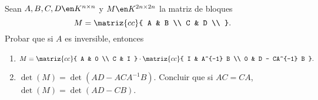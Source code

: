 \begin{enunciado}{\ejercicio}
  Sean $A, B, C, D \en K^{n \times n}$ y $M \en K^{2n \times 2n}$ la matriz de bloques
  $$
    M =
    \matriz{cc}{
      A & B \\
      C & D \\
    }.
  $$
  Probar que si $A$ es inversible, entonces
  \begin{enumerate}[label=(\alph*)]
    \item $M =
            \matriz{cc}{
              A & 0 \\
              C & I
            }
            \cdot
            \matriz{cc}{
              I & A^{-1} B \\
              0 & D - CA^{-1} B
            }.$

    \item $\det(M) = \det(AD - ACA^{-1}B).$ Concluir que si $AC = CA$, $\det(M) = \det(AD - CB)$.
  \end{enumerate}
\end{enunciado}

